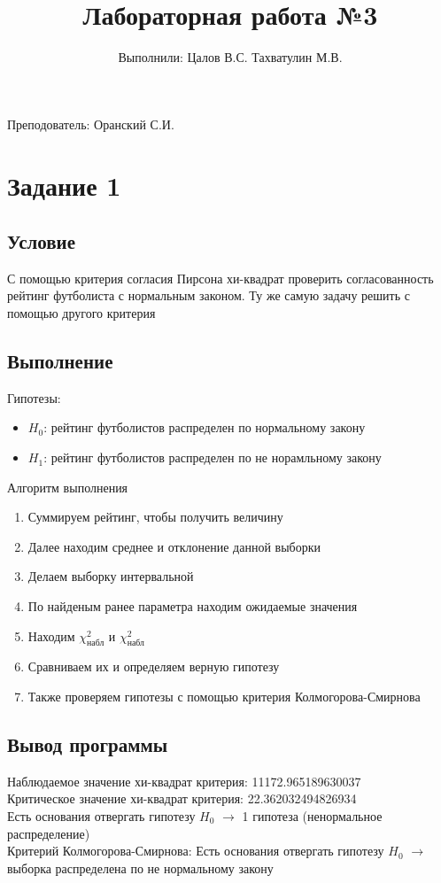 \documentclass{article}
\title{Лабораторная работа №3}
\author{Выполнили: Цалов В.С. Тахватулин М.В.}
\begin{document}
\maketitle
\begin{center}
      {\fontsize{14}{15}\selectfont
            Преподователь: Оранский С.И.
      }
\end{center}
\section{Задание 1}
\subsection{Условие}
С помощью критерия согласия Пирсона хи-квадрат проверить согласованность
рейтинг футболиста с нормальным законом. Ту же самую задачу решить с помощью другого
критерия
\subsection{Выполнение}
Гипотезы: 
\begin{itemize}
      \item $H_0$: рейтинг футболистов распределен по нормальному закону
      \item $H_1$: рейтинг футболистов распределен по не норамльному закону
\end{itemize}
Алгоритм выполнения
\begin{enumerate}
      \item Суммируем рейтинг, чтобы получить величину
      \item Далее находим среднее и отклонение данной выборки
      \item Делаем выборку интервальной
      \item По найденым ранее параметра находим ожидаемые значения
      \item Находим $ \chi^2_{\text{набл}} $ и $ \chi^2_{\text{набл}} $
      \item Сравниваем их и определяем верную гипотезу
      \item Также проверяем гипотезы с помощью критерия Колмогорова-Смирнова
\end{enumerate}
\subsection{Вывод программы}
Наблюдаемое значение хи-квадрат критерия: 11172.965189630037 \\ 
Критическое значение хи-квадрат критерия: 22.362032494826934 \\ 
Есть основания отвергать гипотезу $H_0$ $\rightarrow$ 1 гипотеза (ненормальное распределение) \\
Критерий Колмогорова-Смирнова:
Есть основания отвергать гипотезу $H_0$ $\rightarrow$ выборка распределена по не нормальному закону
\end{document}
